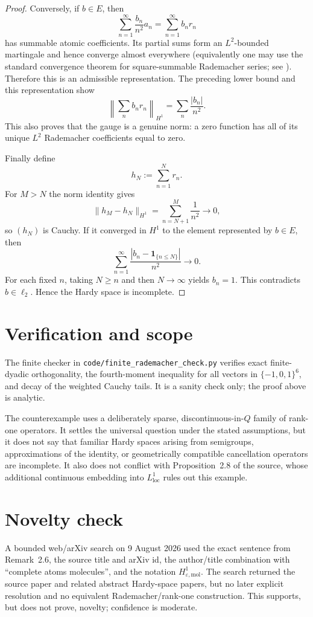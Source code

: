 \documentclass[11pt]{article}
\newcommand{\1}{\mathbf 1}
\newcommand{\eps}{\varepsilon}
\begin{document}
\begin{proof}
Conversely, if $b\in E$, then
\[
  \sum_{n=1}^\infty\frac{b_n}{n^2}a_n=\sum_{n=1}^\infty b_nr_n
\]
has summable atomic coefficients. Its partial sums form an $L^2$-bounded martingale and hence converge almost everywhere (equivalently one may use the standard convergence theorem for square-summable Rademacher series; see \cite[Chapter 22]{Billingsley}). Therefore this is an admissible representation. The preceding lower bound and this representation show
\[
  \left\|\sum_nb_nr_n\right\|_{H^1}
  =\sum_n\frac{|b_n|}{n^2}.
\]
This also proves that the gauge is a genuine norm: a zero function has all of its unique $L^2$ Rademacher coefficients equal to zero.

Finally define
\[
  h_N:=\sum_{n=1}^N r_n.
\]
For $M>N$ the norm identity gives
\[
  \|h_M-h_N\|_{H^1}=\sum_{n=N+1}^M\frac1{n^2}\longrightarrow0,
\]
so $(h_N)$ is Cauchy. If it converged in $H^1$ to the element represented by $b\in E$, then
\[
  \sum_{n=1}^\infty\frac{|b_n-\1_{\{n\leq N\}}|}{n^2}\longrightarrow0.
\]
For each fixed $n$, taking $N\geq n$ and then $N\to\infty$ yields $b_n=1$. This contradicts $b\in\ell_2$. Hence the Hardy space is incomplete.
\end{proof}

\section{Verification and scope}

The finite checker in \texttt{code/finite\_rademacher\_check.py} verifies exact finite-dyadic orthogonality, the fourth-moment inequality for all vectors in $\{-1,0,1\}^6$, and decay of the weighted Cauchy tails. It is a sanity check only; the proof above is analytic.

The counterexample uses a deliberately sparse, discontinuous-in-$Q$ family of rank-one operators. It settles the universal question under the stated assumptions, but it does not say that familiar Hardy spaces arising from semigroups, approximations of the identity, or geometrically compatible cancellation operators are incomplete. It also does not conflict with Proposition~2.8 of the source, whose additional continuous embedding into $L^1_{\mathrm{loc}}$ rules out this example.

\section{Novelty check}

A bounded web/arXiv search on 9 August 2026 used the exact sentence from Remark~2.6, the source title and arXiv id, the author/title combination with ``complete atoms molecules'', and the notation $H^1_{\eps,\mathrm{mol}}$. The search returned the source paper and related abstract Hardy-space papers, but no later explicit resolution and no equivalent Rademacher/rank-one construction. This supports, but does not prove, novelty; confidence is moderate.
\end{document}
